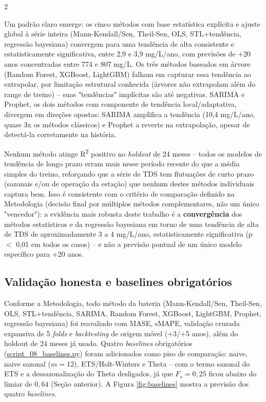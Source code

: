 \begin{multicols*}{2}

Um padrão claro emerge: os cinco métodos com base estatística explícita e ajuste global à série inteira (Mann-Kendall/Sen, Theil-Sen, OLS, STL+tendência, regressão bayesiana) convergem para uma tendência de alta consistente e estatisticamente significativa, entre 2,9 e 3,9 mg/L/ano, com previsões de +20 anos concentradas entre 774 e 807 mg/L. Os três métodos baseados em árvore (Random Forest, XGBoost, LightGBM) falham em capturar essa tendência ao extrapolar, por limitação estrutural conhecida (árvores não extrapolam além do range de treino) -- suas "tendências" implícitas são até negativas. SARIMA e Prophet, os dois métodos com componente de tendência local/adaptativa, divergem em direções opostas: SARIMA amplifica a tendência (10,4 mg/L/ano, quase 3x os métodos clássicos) e Prophet a reverte na extrapolação, apesar de detectá-la corretamente na história.

Nenhum método atinge R\textsuperscript{2} positivo no \textit{holdout} de 24 meses -- todos os modelos de tendência de longo prazo erram mais nesse período recente do que a média simples do treino, reforçando que a série de TDS tem flutuações de curto prazo (sazonais e/ou de operação da estação) que nenhum destes métodos individuais captura bem. Isso é consistente com o critério de comparação definido na Metodologia (decisão final por múltiplos métodos complementares, não um único "vencedor"): a evidência mais robusta deste trabalho é a \textbf{convergência} dos métodos estatísticos e da regressão bayesiana em torno de uma tendência de alta de TDS de aproximadamente 3 a 4 mg/L/ano, estatisticamente significativa (p $<$ 0,01 em todos os casos) -- e não a previsão pontual de um único modelo específico para +20 anos.

\subsection{Validação honesta e baselines obrigatórios}

Conforme a Metodologia, todo método da bateria (Mann-Kendall/Sen, Theil-Sen, OLS, STL+tendência, SARIMA, Random Forest, XGBoost, LightGBM, Prophet, regressão bayesiana) foi reavaliado com MASE, sMAPE, validação cruzada expansiva de 5 \textit{folds} e \textit{backtesting} de origem móvel (+3/+5 anos), além do holdout de 24 meses já usado. Quatro \textit{baselines} obrigatórios (\url{script_08_baselines.py}) foram adicionados como piso de comparação: naive, naive sazonal ($m=12$), ETS/Holt-Winters e Theta -- com o termo sazonal do ETS e a dessazonalização do Theta desligados, já que $F_s=0{,}25$ ficou abaixo do limiar de $0{,}64$ (Seção anterior). A Figura \ref{fig:baselines} mostra a previsão dos quatro \textit{baselines}.


\end{multicols*}
